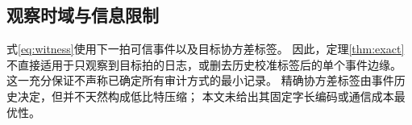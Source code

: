 \subsection{观察时域与信息限制}
式\eqref{eq:witness}使用下一拍可信事件以及目标协方差标签。
因此，定理\ref{thm:exact}不直接适用于只观察到目标拍的日志，或删去历史校准标签后的单个事件边缘。
这一充分保证不声称已确定所有审计方式的最小记录。
精确协方差标签由事件历史决定，但并不天然构成低比特压缩；
本文未给出其固定字长编码或通信成本最优性。
